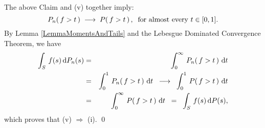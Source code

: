 \vskip 0.3cm
\noindent
The above Claim and (v) together imply:
\begin{equation*}
P_{n}\!\left(\,f > t\,\right) \;\longrightarrow\; P\!\left(\,f > t\,\right),
\;\;\textnormal{for almost every $t \in [0,1]$}.
\end{equation*}
By Lemma \ref{LemmaMomentsAndTails} and the Lebesgue Dominated Convergence Theorem, we have
\begin{eqnarray*}
\int_{S}\,f(s)\,\textnormal{d} P_{n}(s) &=& \int_{0}^{\infty}\,P_{n}\!\left(\,f > t\,\right)\,\textnormal{d} t
\\
&=& \int_{0}^{1}\,P_{n}\!\left(\,f > t\,\right)\,\textnormal{d} t \;\;\longrightarrow\;\; \int_{0}^{1}\,P\!\left(\,f > t\,\right)\,\textnormal{d} t
\\
&=& \int_{0}^{\infty}\,P\!\left(\,f > t\,\right)\,\textnormal{d} t
\;\;=\;\; \int_{S}\,f(s)\,\textnormal{d} P(s),
\end{eqnarray*}
which proves that (v) $\Longrightarrow$ (i).
\qed

